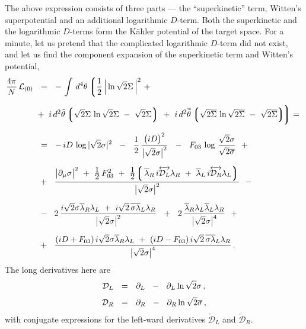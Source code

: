 \documentclass[epsfig,12pt]{article}
\newcommand{\cell}{{\mathcal L}}
\newcommand{\p}{\partial}
\newcommand{\ov}{\overline}
\newcommand{\md}{\mathcal{D}}
\newcommand{\lgr}{\left\lgroup}
\newcommand{\rgr}{\right\rgroup}
\begin{document}
	The above expression consists of three parts --- the ``superkinetic'' term, Witten's superpotential
	and an additional logarithmic $ D $-term.
	Both the superkinetic and the logarithmic $ D $-terms form the K\"{a}hler potential of the target space.
	For a minute, let us pretend that the complicated logarithmic $ D $-term did not exist, 
	and let us find the component expansion of the superkinetic term and Witten's potential,
\begin{align}
%
\notag
	\frac{4\pi}{N}\, \cell_{(0)} &    ~~=~~
	-\, \int\, d^4\theta\, \bigg\lgroup \frac{1}{2}\, \Big| \ln \sqrt{2}\Sigma \, \Big|^2
			~+~ 
	\\[2mm]
%
\notag
	&
			~+~
			i\, d^2\tilde\theta 
			\lgr \sqrt{2}\Sigma\, \ln \sqrt{2}\Sigma  ~-~ \sqrt{2}\Sigma \rgr
			~+~
			i\, d^2\ov{\tilde\theta}
			\lgr \sqrt{2}\ov\Sigma\, \ln \sqrt{2}\ov\Sigma  ~-~ \sqrt{2}\ov\Sigma \rgr
			\!\!\bigg\rgroup
			=~ 
	\\[2mm]
%
\notag
	&     ~~=~~
	-\,iD\, \log |\sqrt{2}\sigma|^2  ~~-~~  \frac{1}{2}\, \frac{ \big(i D\big)^2 } { \big|\sqrt{2}\sigma\big|^2 }
	~~-~~ F_{03}\, \log\, \frac{\sqrt{2}\sigma}{\sqrt{2}\ov\sigma}
	~~+~~
	\\[2mm]
%
\label{L0}
	&
	~~+~~ \frac{
		\big|\p_\mu \sigma\big|^2  ~+~  \frac{\displaystyle 1}{\displaystyle 2}\,F_{03}^2  ~+~
		\frac{\displaystyle 1}{\displaystyle 2}\!
			    \lgr\, \ov\lambda{}_R\, i\overleftrightarrow{\md_L} \lambda_R  ~+~ 
				   \ov\lambda{}_L\, i\overleftrightarrow{\md_R} \lambda_L \rgr
		} { \big|\sqrt{2}\sigma\big|^2 }
	~~-~~
	\\[2mm]
%
\notag
	&
	~~-~~ 2\,\frac{
			i\sqrt{2}\sigma\ov\lambda{}_R\lambda_L  ~+~  
			i\sqrt{2}\,\ov{\sigma\lambda}{}_L\lambda_R
		} { \big|\sqrt{2}\sigma\big|^2 }
	~~+~~ 2\, \frac{
			\ov\lambda{}_R \lambda_L \ov\lambda{}_L \lambda_R
		} { \big|\sqrt{2}\sigma\big|^4 }
	~~+~~
	\\[2mm]
%
\notag
	&
	~~+~~
	\frac{	(iD + F_{03})\, i\sqrt{2}\sigma \ov\lambda{}_R\lambda_L ~+~
		(iD - F_{03})\, i\sqrt{2}\,\ov{\sigma \lambda}{}_L\lambda_R  }
		{ \big|\sqrt{2}\sigma\big|^4 }\,.
\end{align}
	The long derivatives here are
\begin{align}
%
\notag
	\md_L &    ~~=~~    \p_L  ~~-~~  \p_L \ln \sqrt{2}\sigma\,,
	\\[1mm]
%
	\md_R &    ~~=~~    \p_R  ~~-~~  \p_R \ln \sqrt{2}\ov\sigma\,,
\end{align}
	with conjugate expressions for the left-ward derivatives 
	$ \overleftarrow{\md}{}_L $ and $ \overleftarrow{\md}{}_R $.
\end{document}
